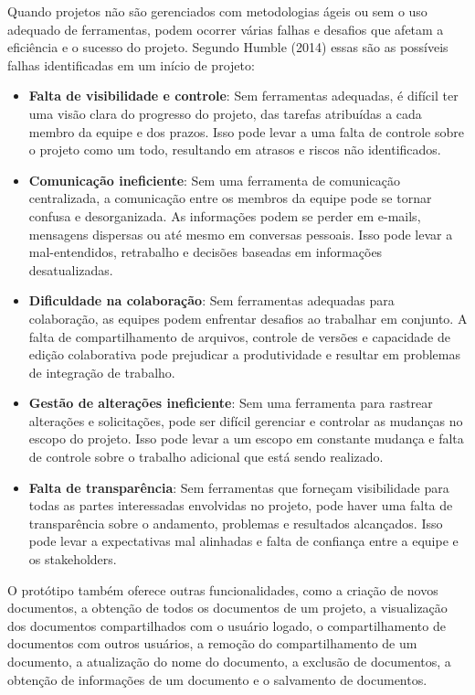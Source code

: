 Quando projetos não são gerenciados com metodologias ágeis ou sem o uso adequado de ferramentas, podem ocorrer várias falhas e desafios que afetam a eficiência e o sucesso do projeto. Segundo Humble (2014) essas são as possíveis falhas identificadas em um início de projeto:
\begin{itemize}
	\item \textbf{Falta de visibilidade e controle}: Sem ferramentas adequadas, é difícil ter uma visão clara do progresso do projeto, das tarefas atribuídas a cada membro da equipe e dos prazos. Isso pode levar a uma falta de controle sobre o projeto como um todo, resultando em atrasos e riscos não identificados.
	\item \textbf{Comunicação ineficiente}: Sem uma ferramenta de comunicação centralizada, a comunicação entre os membros da equipe pode se tornar confusa e desorganizada. As informações podem se perder em e-mails, mensagens dispersas ou até mesmo em conversas pessoais. Isso pode levar a mal-entendidos, retrabalho e decisões baseadas em informações desatualizadas.
	\item \textbf{Dificuldade na colaboração}: Sem ferramentas adequadas para colaboração, as equipes podem enfrentar desafios ao trabalhar em conjunto. A falta de compartilhamento de arquivos, controle de versões e capacidade de edição colaborativa pode prejudicar a produtividade e resultar em problemas de integração de trabalho.
	\item \textbf{Gestão de alterações ineficiente}: Sem uma ferramenta para rastrear alterações e solicitações, pode ser difícil gerenciar e controlar as mudanças no escopo do projeto. Isso pode levar a um escopo em constante mudança e falta de controle sobre o trabalho adicional que está sendo realizado.
	\item \textbf{Falta de transparência}: Sem ferramentas que forneçam visibilidade para todas as partes interessadas envolvidas no projeto, pode haver uma falta de transparência sobre o andamento, problemas e resultados alcançados. Isso pode levar a expectativas mal alinhadas e falta de confiança entre a equipe e os stakeholders.
\end{itemize}



O protótipo também oferece outras funcionalidades, como a criação de novos documentos, a obtenção de todos os documentos de um projeto, a visualização dos documentos compartilhados com o usuário logado, o compartilhamento de documentos com outros usuários, a remoção do compartilhamento de um documento, a atualização do nome do documento, a exclusão de documentos, a obtenção de informações de um documento e o salvamento de documentos.